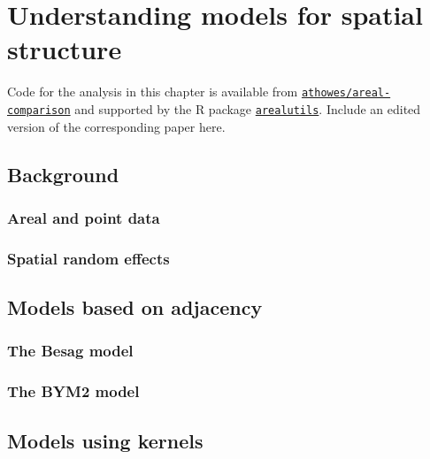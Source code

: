 \documentclass[a4paper, nobind]{templates/ociamthesis}
\begin{document}
\hypertarget{understanding-models-for-spatial-structure}{%
\chapter{Understanding models for spatial structure}\label{understanding-models-for-spatial-structure}}

\adjustmtc
{}

Code for the analysis in this chapter is available from \href{https://github.com/athowes/areal-comparison}{\texttt{athowes/areal-comparison}} and supported by the R package \href{https://athowes.github.io/arealutils}{\texttt{arealutils}}.
Include an edited version of the corresponding paper here.

\hypertarget{background-1}{%
\section{Background}\label{background-1}}

\hypertarget{areal-and-point-data}{%
\subsection{Areal and point data}\label{areal-and-point-data}}

\hypertarget{spatial-random-effects}{%
\subsection{Spatial random effects}\label{spatial-random-effects}}

\hypertarget{models-based-on-adjacency}{%
\section{Models based on adjacency}\label{models-based-on-adjacency}}

\hypertarget{the-besag-model}{%
\subsection{The Besag model}\label{the-besag-model}}

\hypertarget{the-bym2-model}{%
\subsection{The BYM2 model}\label{the-bym2-model}}

\hypertarget{models-using-kernels}{%
\section{Models using kernels}\label{models-using-kernels}}
\end{document}

